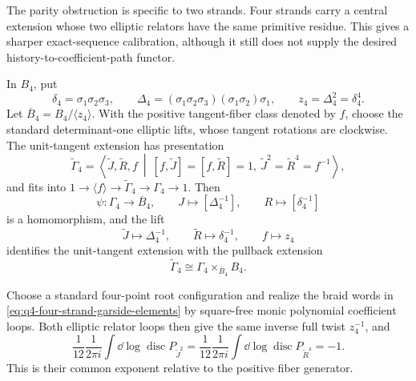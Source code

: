 The parity obstruction is specific to two strands.  Four strands carry a
central extension whose two elliptic relators have the same primitive residue.
This gives a sharper exact-sequence calibration, although it still does not
supply the desired history-to-coefficient-path functor.

\begin{proposition}
\label{prop:q4-four-strand-central-calibration}
In $B_4$, put
\begin{equation}
 \delta_4=\sigma_1\sigma_2\sigma_3,
 \qquad
 \Delta_4=(\sigma_1\sigma_2\sigma_3)(\sigma_1\sigma_2)\sigma_1,
 \qquad
 z_4=\Delta_4^2=\delta_4^4.
 \label{eq:q4-four-strand-garside-elements}
\end{equation}
Let $\overline B_4=B_4/\langle z_4\rangle$.  With the positive tangent-fiber
class denoted by $f$, choose the standard determinant-one elliptic lifts, whose
tangent rotations are clockwise.  The unit-tangent extension has presentation
\begin{equation}
 \widetilde\Gamma_4
 =\left\langle \widetilde J,\widetilde R,f\ \middle|\
 [f,\widetilde J]=[f,\widetilde R]=1,\
 \widetilde J^2=\widetilde R^4=f^{-1}\right\rangle,
\label{eq:q4-unit-tangent-central-presentation}
\end{equation}
and fits into
$1\to\langle f\rangle\to\widetilde\Gamma_4\to\Gamma_4\to1$.
Then
\begin{equation}
 \psi:\Gamma_4\longrightarrow\overline B_4,
 \qquad
 J\longmapsto[\Delta_4^{-1}],
 \qquad
 R\longmapsto[\delta_4^{-1}]
 \label{eq:q4-four-strand-quotient-map}
\end{equation}
is a homomorphism, and the lift
\begin{equation}
 \widetilde J\longmapsto\Delta_4^{-1},
 \qquad
 \widetilde R\longmapsto\delta_4^{-1},
 \qquad
 f\longmapsto z_4
 \label{eq:q4-four-strand-central-lift}
\end{equation}
identifies the unit-tangent extension with the pullback extension
\begin{equation}
 \widetilde\Gamma_4
 \cong
 \Gamma_4\mathbin{\times}_{\overline B_4}B_4.
 \label{eq:q4-four-strand-pullback-extension}
\end{equation}

Choose a standard four-point root configuration and realize the braid words in
\eqref{eq:q4-four-strand-garside-elements} by square-free monic polynomial
coefficient loops.  Both elliptic relator loops then give the same inverse full
twist $z_4^{-1}$, and
\begin{equation}
 \frac1{12}\frac1{2\pi i}\int\dd\log\operatorname{disc}P_{\widetilde J^2}
 =
 \frac1{12}\frac1{2\pi i}\int\dd\log\operatorname{disc}P_{\widetilde R^4}
 =-1.
 \label{eq:q4-four-strand-normalized-discriminant-period}
\end{equation}
This is their common exponent relative to the positive fiber generator.
\end{proposition}

